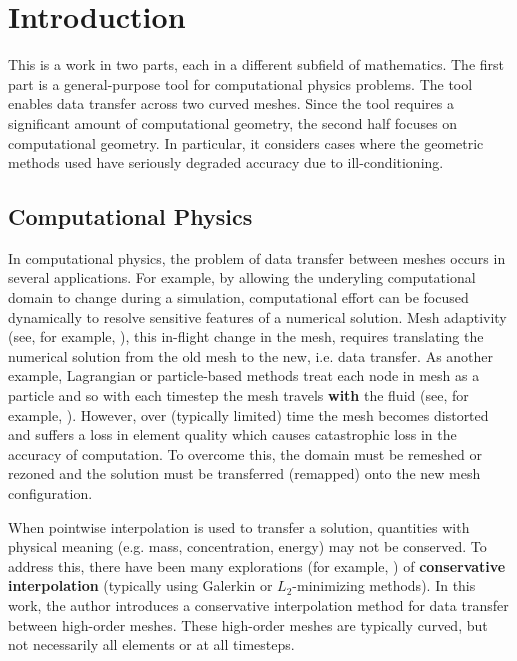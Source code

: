 \chapter{Introduction}

This is a work in two parts, each in a different subfield of mathematics.
The first part is a general-purpose tool for computational physics problems.
The tool enables data transfer across two curved meshes.
Since the tool requires a significant amount of computational geometry, the
second half focuses on computational geometry. In particular, it considers
cases where the geometric methods used have seriously degraded accuracy due to
ill-conditioning.

\section{Computational Physics}

In computational physics, the problem of data transfer between meshes
occurs in several applications. For example, by allowing the underyling
computational domain to change during a simulation, computational
effort can be focused dynamically to resolve sensitive features
of a numerical solution. Mesh adaptivity (see, for example,
\cite{Babuska1978, Peraire1987, Pain2001}), this in-flight change in the mesh,
requires translating the numerical solution from the old mesh to the new,
i.e. data transfer. As another example, Lagrangian or particle-based methods
treat each node in mesh as a particle and so with each timestep the mesh
travels \textbf{with} the fluid (see, for example, \cite{Hirt1974}).
However, over (typically limited) time the mesh
becomes distorted and suffers a loss in element quality which causes
catastrophic loss in the accuracy of computation. To overcome this, the
domain must be remeshed or rezoned and the solution must be
transferred (remapped) onto the new mesh configuration.

When pointwise interpolation is used to transfer a solution, quantities with
physical meaning (e.g. mass, concentration, energy) may not be conserved.
To address this, there have been many explorations (for example,
\cite{Jiao2004, Farrell2009, Farrell2011}) of
\textbf{conservative interpolation} (typically using Galerkin or
\(L_2\)-minimizing methods). In this work, the author introduces a
conservative interpolation method for data transfer between high-order
meshes. These high-order meshes are typically curved, but not necessarily
all elements or at all timesteps.

